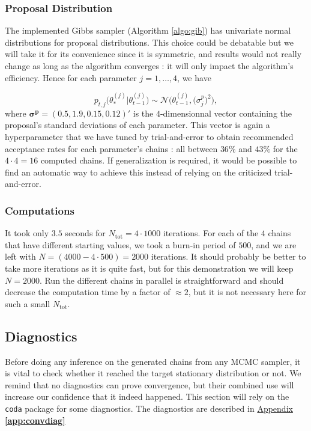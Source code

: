 \subsubsection*{Proposal Distribution}


The implemented Gibbs sampler (Algorithm \ref{algo:gib}) has univariate normal distributions for proposal distributions. This choice could be debatable but we will take it for its convenience since it is symmetric, and results would not really change as long as the algorithm converges : it will only impact the algorithm's efficiency. Hence for each parameter $j=1,\ldots,4$, we have 

\begin{equation}
p_{t,j}\Big(\theta^{(j)}_*|\theta^{(j)}_{t-1}\Big) \sim \mathcal{N}\Big(\theta^{(j)}_{t-1},\big(\sigma^p_j\big)^2 \Big),
\end{equation}
where $\boldsymbol{\sigma^p}=(0.5, 1.9, 0.15,0.12)'$ is the $4$-dimensionnal vector containing the proposal's standard deviations of each parameter. This vector is again a hyperparameter that we have tuned by trial-and-error to obtain recommended acceptance rates for each parameter's chains : all between $36\%$ and $43\%$ for the $4\cdot 4=16$ computed chains. If generalization is required, it would be possible to find an automatic way to achieve this instead of relying on the criticized trial-and-error. 


\subsubsection*{Computations} 

It took only $3.5$ seconds for $N_{\text{tot}}=4\cdot 1000$ iterations. For each of the $4$ chains that have different starting values, we took a burn-in period of $500$, and we are left with $N=(4000-4\cdot 500)=2000$ iterations. It should probably be better to take more iterations as it is quite fast, but for this demonstration we will keep $N=2000$.
Run the different chains in parallel is straightforward and should decrease the computation time by a factor of $\approx 2$, but it is not necessary here for such a small $N_{\text{tot}}$.
 
 
\subsection{Diagnostics}

Before doing any inference on the generated chains from any MCMC sampler, it is vital to check whether it reached the target stationary distribution or not.
We remind that no diagnostics can prove convergence, but their combined use will increase our confidence that it indeed happened.
This section will rely on the \texttt{coda} package for some diagnostics. The diagnostics are described in \hyperref[app:convdiag]{Appendix \textbf{\ref{app:convdiag}}}

